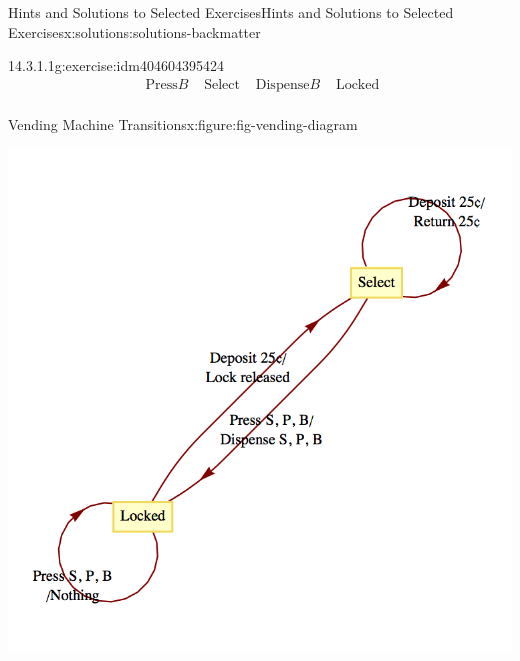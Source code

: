 \documentclass[twoside,10pt,]{book}
\newcommand{\blocktitlefont}{\relax}
\numberwithin{equation}{section}
\begin{document}
\begin{solutions-chapter}{Hints and Solutions to Selected Exercises}{}{Hints and Solutions to Selected Exercises}{}{}{x:solutions:solutions-backmatter}
\begin{divisionsolution}{14.3.1.1}{}{g:exercise:idm404604395424}
\begin{equation*}
\begin{array}{cccc}
\textrm{ Press} B & \textrm{ Select} & \textrm{ Dispense} B & \textrm{ Locked} \\
\end{array}
\end{equation*}
%
\begin{figureptx}{Vending Machine Transitions}{x:figure:fig-vending-diagram}{}%
\begin{image}{0.15}{0.7}{0.15}%
\includegraphics[width=\linewidth]{images/fig-vending-diagram.png}
\end{image}%
\tcblower
\end{figureptx}%
\end{divisionsolution}%
%
\end{solutions-chapter}
\end{document}
